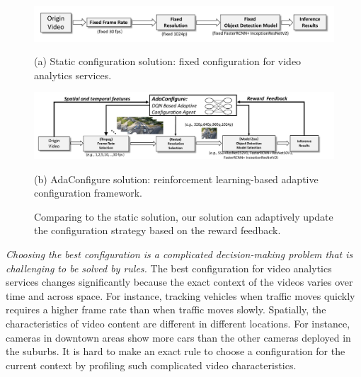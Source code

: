 \begin{figure}[!t]
	\begin{minipage}{\linewidth}
		\centerline{\includegraphics[width=0.9\linewidth]{figures/static_framework.pdf}}
		\begin{center}
			{(a) Static configuration solution: fixed configuration for video analytics services.}
		\end{center}
	\end{minipage}
	\vfill
	\vspace{0.4cm}
	\begin{minipage}{\linewidth}
		\centerline{\includegraphics[width=0.9\linewidth]{figures/auto_framework.pdf}}
		\vspace{0.2cm}
		\begin{center}
			{(b) AdaConfigure solution: reinforcement learning-based adaptive configuration framework.}
		\end{center}
	\end{minipage}
	\caption{Comparing to the static solution, our solution can adaptively update the configuration strategy based on the reward feedback.}
	\label{fig: framework}
	\vspace{-0.5cm}
\end{figure}

\emph{Choosing the best configuration is a complicated decision-making problem that is challenging to be solved by rules.} The best configuration for video analytics services changes significantly because the exact context of the videos varies over time and across space. For instance, tracking vehicles when traffic moves quickly requires a higher frame rate than when traffic moves slowly. Spatially, the characteristics of video content are different in different locations. For instance, cameras in downtown areas show more cars than the other cameras deployed in the suburbs. It is hard to make an exact rule to choose a configuration for the current context by profiling such complicated video characteristics.

